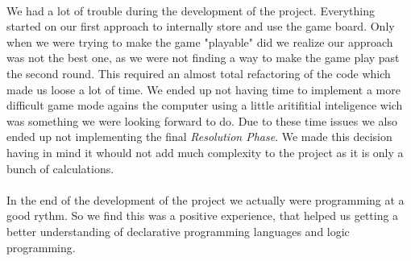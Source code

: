\documentclass[a4paper]{article}
\begin{document}
\paragraph{}
We had a lot of trouble during the development of the project. Everything started on our first
approach to internally store and use the game board. Only when we were trying to make 
the game "playable" did we realize our approach was not the best one, as we were not finding a 
way to make the game play past the second round. This required an almost total refactoring of
the code which made us loose a lot of time. We ended up not having time to implement a more 
difficult game mode agains the computer using a little aritifitial inteligence wich was 
something we were looking forward to do. Due to these time issues we also ended up not implementing
the final \textit{Resolution Phase}. We made this decision having in mind it whould not add much complexity
to the project as it is only a bunch of calculations.

\paragraph{}
In the end of the development of the project we actually were programming at a good rythm. So 
we find this was a positive experience, that helped us getting a better understanding 
of declarative programming languages and logic programming.


\clearpage
\renewcommand\refname{Apendix}



\newpage
\appendix
\end{document}
